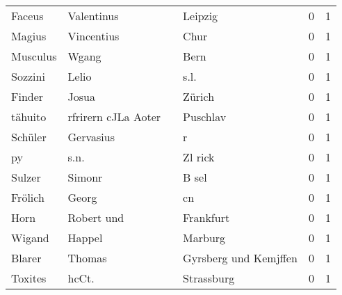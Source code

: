 \documentclass[10pt,a4paper,landscape]{article}
\begin{document}
\begin{longtable}{llllrr}
                   Faceus &                         Valentinus &             &                                     Leipzig &          0 &         1 \\
                   Magius &                         Vincentius &             &                                        Chur &          0 &         1 \\
                 Musculus &                              Wgang &             &                                        Bern &          0 &         1 \\
                  Sozzini &                              Lelio &             &                                        s.l. &          0 &         1 \\
                   Finder &                              Josua &             &                                      Zürich &          0 &         1 \\
                  tähuito &                rfrirern cJLa Aoter &             &                                    Puschlav &          0 &         1 \\
                  Schüler &                          Gervasius &             &                                           r &          0 &         1 \\
                       py &                               s.n. &             &                                     Zl rick &          0 &         1 \\
                   Sulzer &                             Simonr &             &                                       B sel &          0 &         1 \\
                  Frölich &                              Georg &             &                                          cn &          0 &         1 \\
                     Horn &                         Robert und &             &                                   Frankfurt &          0 &         1 \\
                   Wigand &                             Happel &             &                                     Marburg &          0 &         1 \\
                   Blarer &                             Thomas &             &                       Gyrsberg und Kemjffen &          0 &         1 \\
                  Toxites &                              hcCt. &             &                                  Strassburg &          0 &         1 \\

\end{longtable}
\end{document}
